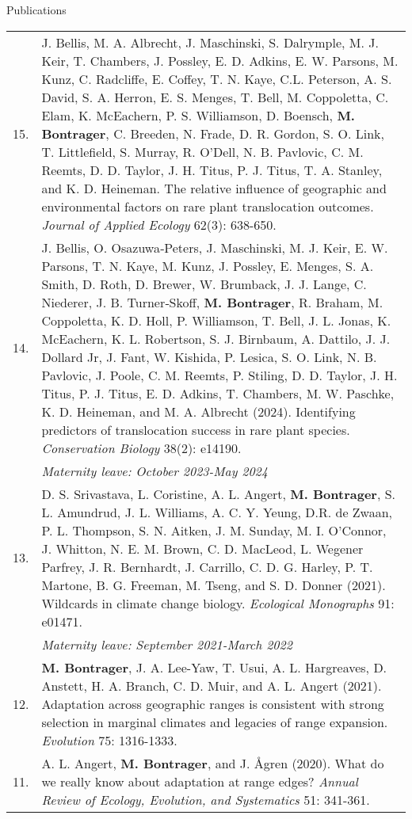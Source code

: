 \documentclass[letterpaper,11pt,oneside]{article}
\begin{document}
\bigskip





\noindent\Large{Publications}  
\normalsize
\medskip

\def\arraystretch{1.4}
\noindent \begin{tabular}{@{} p{0.5cm} >{\raggedright\arraybackslash}p{16.7cm}}
15. & J. Bellis, M. A. Albrecht, J. Maschinski, S. Dalrymple, M. J. Keir, T. Chambers, J. Possley, E. D. Adkins, E. W. Parsons, M. Kunz, C. Radcliffe, E. Coffey, T. N. Kaye, C.L. Peterson, A. S. David, S. A. Herron, E. S. Menges, T. Bell, M. Coppoletta, C. Elam, K. McEachern, P. S. Williamson, D. Boensch, \textbf{M. Bontrager}, C. Breeden, N. Frade, D. R. Gordon, S. O. Link, T. Littlefield, S. Murray, R. O'Dell, N. B. Pavlovic, C. M. Reemts, D. D. Taylor, J. H. Titus, P. J. Titus, T. A. Stanley, and K. D. Heineman. The relative influence of geographic and environmental factors on rare plant translocation outcomes. \textit{Journal of Applied Ecology} 62(3): 638-650. \\ 
14. & J. Bellis, O. Osazuwa‐Peters, J. Maschinski, M. J. Keir, E. W. Parsons, T. N. Kaye, M. Kunz, J. Possley, E. Menges, S. A. Smith, D. Roth, D. Brewer, W. Brumback, J. J. Lange, C. Niederer, J. B. Turner‐Skoff, \textbf{M. Bontrager}, R. Braham, M. Coppoletta, K. D. Holl, P. Williamson, T. Bell, J. L. Jonas, K. McEachern, K. L. Robertson, S. J. Birnbaum, A. Dattilo, J. J. Dollard Jr, J. Fant, W. Kishida, P. Lesica, S. O. Link, N. B. Pavlovic, J. Poole, C. M. Reemts, P. Stiling, D. D. Taylor, J. H. Titus, P. J. Titus, E. D. Adkins, T. Chambers, M. W. Paschke, K. D. Heineman, and M. A. Albrecht (2024). Identifying predictors of translocation success in rare plant species. \textit{Conservation Biology} 38(2): e14190. \\
& \textit{Maternity leave: October 2023-May 2024} \\
13. & D. S. Srivastava, L. Coristine, A. L. Angert, \textbf{M. Bontrager}, S. L. Amundrud, J. L. Williams, A. C. Y. Yeung, D.R. de Zwaan, P. L. Thompson, S. N. Aitken, J. M. Sunday, M. I. O'Connor, J. Whitton, N. E. M. Brown, C. D. MacLeod, L. Wegener Parfrey, J. R. Bernhardt, J. Carrillo, C. D. G. Harley, P. T. Martone, B. G. Freeman, M. Tseng, and S. D. Donner (2021). Wildcards in climate change biology. \textit{Ecological Monographs} 91: e01471. \\ 
& \textit{Maternity leave: September 2021-March 2022} \\
12. & \textbf{M. Bontrager}, J. A. Lee-Yaw, T. Usui, A. L. Hargreaves, D. Anstett, H. A. Branch, C. D. Muir, and A. L. Angert (2021). Adaptation across geographic ranges is consistent with strong selection in marginal climates and legacies of range expansion. \textit{Evolution} 75: 1316-1333. \\
11. & A. L. Angert, \textbf{M. Bontrager}, and J. \AA gren (2020). What do we really know about adaptation at range edges? \textit{Annual Review of Ecology, Evolution, and Systematics} 51: 341-361. \\
\end{tabular}
\end{document}
